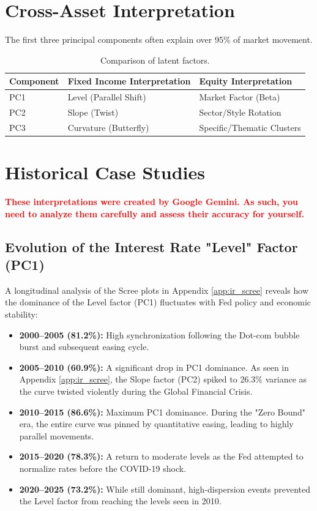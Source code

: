 \documentclass[11pt]{article}
\begin{document}
\section{Cross-Asset Interpretation}
The first three principal components often explain over 95\% of market movement.

\begin{table}[h]
\centering
\begin{tabular}{@{}lll@{}}
\toprule
\textbf{Component} & \textbf{Fixed Income Interpretation} & \textbf{Equity Interpretation} \\ \midrule
PC1 & Level (Parallel Shift) & Market Factor (Beta) \\
PC2 & Slope (Twist) & Sector/Style Rotation \\
PC3 & Curvature (Butterfly) & Specific/Thematic Clusters \\ \bottomrule
\end{tabular}
\caption{Comparison of latent factors.}
\end{table}

\newpage
\section{Historical Case Studies}

\textcolor{red}{\textbf{These interpretations were created by Google Gemini. As such, you need to analyze them carefully and assess their accuracy for yourself.}}

\subsection{Evolution of the Interest Rate "Level" Factor (PC1)}
A longitudinal analysis of the Scree plots in Appendix \ref{app:ir_scree} reveals how the dominance of the Level factor (PC1) fluctuates with Fed policy and economic stability:
\begin{itemize}
    \item \textbf{2000--2005 (81.2\%):} High synchronization following the Dot-com bubble burst and subsequent easing cycle.
    \item \textbf{2005--2010 (60.9\%):} A significant drop in PC1 dominance. As seen in Appendix \ref{app:ir_scree}, the Slope factor (PC2) spiked to 26.3\% variance as the curve twisted violently during the Global Financial Crisis.
    \item \textbf{2010--2015 (86.6\%):} Maximum PC1 dominance. During the "Zero Bound" era, the entire curve was pinned by quantitative easing, leading to highly parallel movements.
    \item \textbf{2015--2020 (78.3\%):} A return to moderate levels as the Fed attempted to normalize rates before the COVID-19 shock.
    \item \textbf{2020--2025 (73.2\%):} While still dominant, high-dispersion events prevented the Level factor from reaching the levels seen in 2010.
\end{itemize}
\end{document}
